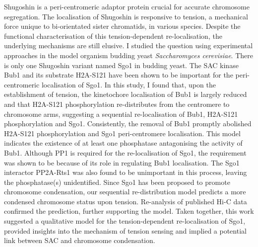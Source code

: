 {Shugoshin is a peri-centromeric adaptor protein crucial for accurate chromosome segregation. The localisation of Shugoshin is responsive to tension, a mechanical force unique to bi-orientated sister chromatids, in various species. Despite the functional characterisation of this tension-dependent re-localisation, the underlying mechanisms are still elusive. I studied the question using experimental approaches in the model organism budding yeast \textit{Saccharomyces cerevisiae}. There is only one Shugoshin variant named Sgo1 in budding yeast. The SAC kinase Bub1 and its substrate H2A-S121 have been shown to be important for the peri-centromeric localisation of Sgo1. In this study, I found that, upon the establishment of tension, the kinetochore localisation of Bub1 is largely reduced and that H2A-S121 phosphorylation re-distributes from the centromere to chromosome arms, suggesting a sequential re-localisation of Bub1, H2A-S121 phosphorylation and Sgo1. Consistently, the removal of Bub1 promptly abolished H2A-S121 phosphorylation and Sgo1 peri-centromere localisation. This model indicates the existence of at least one phosphatase antagonising the activity of Bub1. Although PP1 is required for the re-localisation of Sgo1, the requirement was shown to be because of its role in regulating Bub1 localisation. The Sgo1 interactor PP2A-Rts1 was also found to be unimportant in this process, leaving the phosphatase(s) unidentified. Since Sgo1 has been proposed to promote chromosome condensation, our sequential re-distribution model predicts a more condensed chromosome status upon tension. Re-analysis of published Hi-C data confirmed the prediction, further supporting the model. Taken together, this work suggested a qualitative model for the tension-dependent re-localisation of Sgo1, provided insights into the mechanism of tension sensing and implied a potential link between SAC and chromosome condensation. 
}


